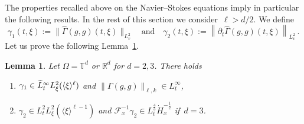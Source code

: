 \documentclass[11pt]{article}
\newtheorem{lemm}[theo]{Lemma}
\theoremstyle{definition}
\numberwithin{equation}{section}
\numberwithin{figure}{section}
\numberwithin{table}{section}
\newcommand*\R {\mathbb{R}}
\newcommand*\T {\mathbb{T}}
\newcommand*{\romanenumi}{\renewcommand*{\theenumi}{\roman{enumi}}}
\let\oldtilde\tilde
\renewcommand*{\tilde}[1]{\mathchoice{\widetilde{#1}}{\widetilde{#1}}{\oldtilde{#1}}{\oldtilde{#1}}}
\begin{document}

The properties recalled above on the Navier--Stokes equations imply in particular the following results. In the rest of this section we consider~$\ell>d/2$. We define
\[
\gamma_1(t,\xi):=\big\| \widehat {\Gamma}(g,g)({t},\xi)\big\|_{L^2_v}\quad \text{and} \quad {\gamma_2}({t},\xi) := \left\| \partial_{t} \widehat {\Gamma}(g,g)(t,\xi) \right\|_{L^2_v} \,.
\]
Let us prove the following Lemma~\ref{lem:gamma&tildegamma}.

\begin{lemm}\label{lem:gamma&tildegamma}
Let $\Omega= \T^d$ or $\R^d$ for $d= 2,3$. There holds 
\begin{enumerate}\romanenumi
\item \label{listlemmB7.1}$ \gamma_1 \in \tilde L^\infty_tL^2_\xi(\langle \xi \rangle^\ell) $ and $\|\Gamma(g,g)\|_{\ell,k} \in L^\infty_t$,
\item \label{listlemmB7.2}$\gamma_2\in L^2_t L^2_\xi(\langle \xi \rangle^{\ell-1})$ and $\mathcal{F}_x^{-1} \gamma_2 \in L^\frac43_{t} \dot H^{-\frac12}_{x}$ if~$d=3$.
\end{enumerate}

\end{lemm}
\end{document}
